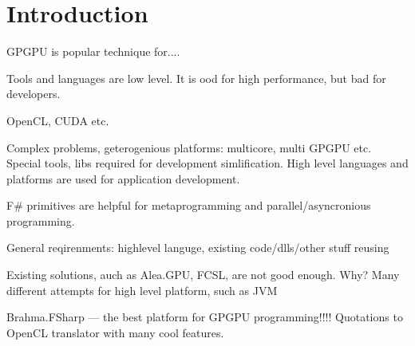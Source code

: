 \section{Introduction}

GPGPU is popular technique for....

Tools and languages are low level.
It is ood for high performance, but bad for developers.

OpenCL, CUDA etc.

Complex problems, geterogenious platforms: multicore, multi GPGPU etc.
Special tools, libs required for development simlification.
High level languages and platforms are used for application development.

F\# primitives are helpful for metaprogramming and parallel/asyncronious programming.

General reqirenments: highlevel languge, existing code/dlls/other stuff reusing

Existing solutions, auch as Alea.GPU, FCSL, are not good enough. Why?
Many different attempts for high level platform, such as JVM

Brahma.FSharp --- the best platform for GPGPU programming!!!!
Quotations to OpenCL translator with many cool features.